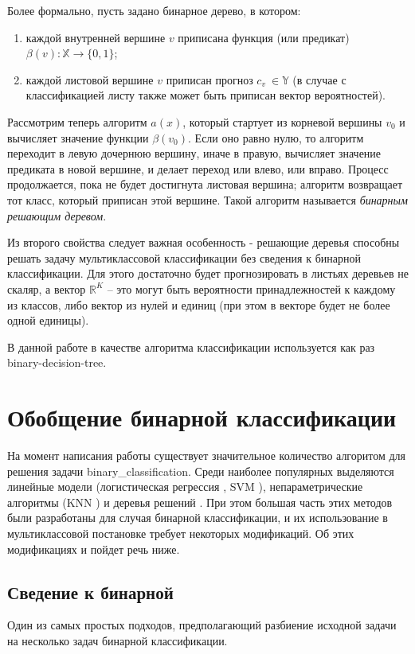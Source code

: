 Более формально, пусть задано бинарное дерево, в котором:
\begin{enumerate}
    \item каждой внутренней вершине $v$ приписана функция (или предикат) $\beta (v) : \mathbb{X} \rightarrow \{0, 1\}$;
    \item каждой листовой вершине $v$ приписан прогноз $c_v~\in \mathbb{Y}$ (в случае с классификацией листу также может быть приписан вектор вероятностей).
\end{enumerate}
Рассмотрим теперь алгоритм $a(x)$, который стартует из корневой вершины $v_0$ и вычисляет значение функции $\beta (v_0)$.
Если оно равно нулю, то алгоритм переходит в левую дочернюю вершину, иначе в правую, вычисляет значение предиката в новой вершине, и делает переход или влево, или вправо.
Процесс продолжается, пока не будет достигнута листовая вершина; алгоритм возвращает тот класс, который приписан этой вершине.
Такой алгоритм называется \textit{бинарным решающим деревом}.

Из второго свойства следует важная особенность - решающие деревья способны решать задачу мультиклассовой классификации без сведения к бинарной классификации.
Для этого достаточно будет прогнозировать в листьях деревьев не скаляр, а вектор $\mathbb{R}^K$ -- это могут быть вероятности принадлежностей к каждому из классов, либо вектор из нулей и единиц (при этом в векторе будет не более одной единицы).

В данной работе в качестве алгоритма классификации используется как раз \gls{binary-decision-tree}.
\section{Обобщение бинарной классификации}
На момент написания работы существует значительное количество алгоритом для решения задачи \gls{binary_classification}.
Среди наиболее популярных выделяются линейные модели (логистическая регрессия \cite{logistic-regression-origins}, SVM \cite{svm_original}), непараметрические алгоритмы (KNN \cite{knn-original}) и деревья решений \cite{decision-trees-original}.
При этом большая часть этих методов были разработаны для случая бинарной классификации, и их использование в мультиклассовой постановке требует некоторых модификаций.
Об этих модификациях и пойдет речь ниже.
\subsection{Сведение к бинарной}
Один из самых простых подходов, предполагающий разбиение исходной задачи на несколько задач бинарной классификации.
